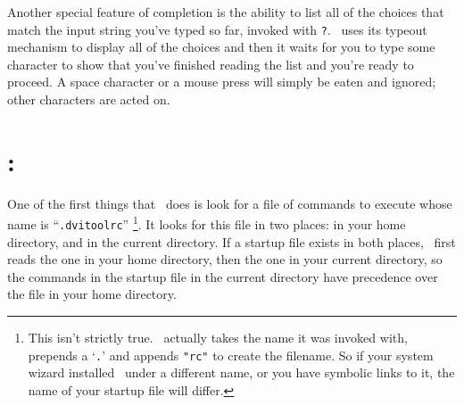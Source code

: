 Another special feature of completion is the ability to list all of the
choices that match the input string you've typed so far, invoked
with {\tt ?}.
\Dtl\ uses
its typeout mechanism to display all of the choices and then it waits
for you to type some character to show that you've finished reading the
list and you're ready to proceed.  A space character or a mouse press
will simply be eaten and ignored; other characters are acted on.

\section{:} One of the first things
that \dtl\ does is look
for a file of commands to execute whose name is
``{\tt .dvitoolrc}''
\footnote*{This isn't strictly true.  \Dtl\ actually takes
the name it was invoked with, prepends a `{\tt .}' and appends {\tt "rc"}
to create the filename.
So if your system wizard installed \dtl\ under a different
name, or you have symbolic links to it, the name of your startup
file will differ.}.
It looks for this file in two places: in your home directory, and in
the current directory.
If a startup file exists in both places, \dtl\ first reads the one in
your home directory, then the one in your current directory,
so the commands in the startup file in the current directory have 
precedence over the file in your home directory.

